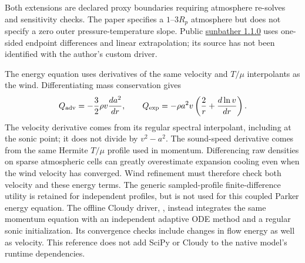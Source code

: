 \documentclass[10pt,a4paper]{article}
\begin{document}
Both extensions are declared proxy boundaries requiring atmosphere
re-solves and sensitivity checks. The paper specifies a $1$--$3R_p$
atmosphere but does not specify a zero outer pressure-temperature slope.
Public \href{https://pypi.org/project/sunbather/1.1.0/}{sunbather 1.1.0}
uses one-sided endpoint differences and linear extrapolation; its source
has not been identified with the author's custom driver.

The energy equation uses derivatives of the same velocity and $T/\mu$
interpolants as the wind. Differentiating mass conservation gives
\begin{equation}
 Q_{\rm adv}=-\frac32\rho v\frac{da^2}{dr},\qquad
 Q_{\rm exp}=-\rho a^2v
       \left(\frac{2}{r}+\frac{d\ln v}{dr}\right).
 \label{eq:flow_gradient}
\end{equation}
The velocity derivative comes from its regular spectral interpolant,
including at the sonic point; it does not divide by $v^2-a^2$.
The sound-speed derivative comes from the same Hermite $T/\mu$ profile
used in momentum. Differencing raw densities on sparse atmospheric cells
can greatly overestimate expansion cooling even when the wind velocity
has converged. Wind refinement must therefore check both velocity and
these energy terms. The generic sampled-profile finite-difference utility
is retained for independent profiles, but is not used for this coupled
Parker energy equation.
The offline Cloudy driver, , instead
integrates the same momentum equation with an independent adaptive ODE
method and a regular sonic initialization. Its convergence checks include
changes in flow energy as well as velocity. This reference does not add
SciPy or Cloudy to the native model's runtime dependencies.

\clearpage
\end{document}
